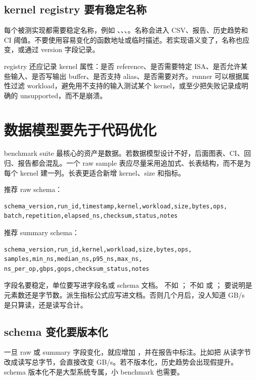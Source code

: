 \subsection{kernel registry 要有稳定名称}

每个被测实现都需要稳定名称，例如 、、、。名称会进入 CSV、报告、历史趋势和 CI 阈值。不要使用容易变化的函数地址或临时描述。若实现语义变了，名称也应变，或通过 version 字段记录。

registry 还应记录 kernel 属性：是否 reference、是否需要特定 ISA、是否允许某些输入、是否写输出 buffer、是否支持 alias、是否需要对齐。runner 可以根据属性过滤 workload，避免用不支持的输入测试某个 kernel，或至少把失败记录成明确的 unsupported，而不是崩溃。

\section{数据模型要先于代码优化}

benchmark suite 最核心的资产是数据。若数据模型设计不好，后面图表、CI、回归、报告都会混乱。一个 raw sample 表应尽量采用追加式、长表结构，而不是为每个 kernel 建一列。长表更适合新增 kernel、size 和指标。

推荐 raw schema：

\begin{lstlisting}
schema_version,run_id,timestamp,kernel,workload,size,bytes,ops,
batch,repetition,elapsed_ns,checksum,status,notes
\end{lstlisting}

推荐 summary schema：

\begin{lstlisting}
schema_version,run_id,kernel,workload,size,bytes,ops,
samples,min_ns,median_ns,p95_ns,max_ns,
ns_per_op,gbps,gops,checksum_status,notes
\end{lstlisting}

字段名要稳定，单位要写进字段名或 schema 文档。  不如 ； 不如  或 ； 要说明是元素数还是字节数。派生指标公式应写进文档。否则几个月后，没人知道 GB/s 是只算读，还是读写合计。

\subsection{schema 变化要版本化}

一旦 raw 或 summary 字段变化，就应增加 ，并在报告中标注。比如把  从读字节改成读写总字节，会直接改变 GB/s。若不版本化，历史趋势会出现假提升。schema 版本化不是大型系统专属，小 benchmark 也需要。

